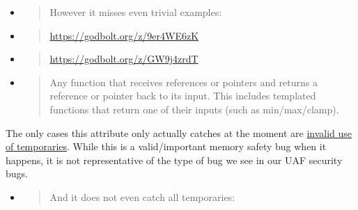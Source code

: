\documentclass[a4paper,12pt,notitlepage,twoside,openright]{article}
\begin{document}
\begin{itemize}
\item
  \begin{quote}
  However it misses even trivial examples:
  \end{quote}
\end{itemize}

\begin{itemize}
\item
  \begin{quote}
  \href{https://www.google.com/url?q=https://godbolt.org/z/9er4WE6zK\&sa=D\&source=editors\&ust=1631944129036000\&usg=AOvVaw2Kh9RhXzwFffwRp6Fm6Y0s}{https://godbolt.org/z/9er4WE6zK}
  \end{quote}
\item
  \begin{quote}
  \href{https://www.google.com/url?q=https://godbolt.org/z/GW9j4zrdT\&sa=D\&source=editors\&ust=1631944129037000\&usg=AOvVaw1nrVEhav1-RhjoWdbBOu8e}{https://godbolt.org/z/GW9j4zrdT}
  \end{quote}
\end{itemize}

\begin{itemize}
\item
  \begin{quote}
  Any function that receives references or pointers and returns a
  reference or pointer back to its input. This includes templated
  functions that return one of their inputs (such as min/max/clamp).
  \end{quote}
\end{itemize}

The only cases this attribute only actually catches at the moment
are \href{https://www.google.com/url?q=https://reviews.llvm.org/D49922\%23inline-440637\&sa=D\&source=editors\&ust=1631944129038000\&usg=AOvVaw0ZgDB7wthr0uf0eXbnCh7s}{invalid
use of temporaries}. While this is a valid/important memory safety bug
when it happens, it is not representative of the type of bug we see in
our UAF security bugs.

\begin{itemize}
\item
  \begin{quote}
  And it does not even catch all temporaries:
  \end{quote}
\end{itemize}
\end{document}
